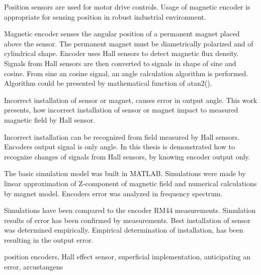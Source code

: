 \documentclass[a4paper,twoside,openright,12pt]{book}
\begin{document}
Position sensors are used for motor drive controls.
Usage of magnetic encoder is appropriate for sensing position in robust industrial environment.

Magnetic encoder senses the angular position of a permanent magnet placed above the sensor.
The permanent magnet must be diametrically polarized and of cylindrical shape.
Encoder uses Hall sensors to detect magnetic flux density.
Signals from Hall sensors are then converted to signals in shape of sine and cosine. From sine an cosine signal, an angle calculation algorithm is performed.
Algorithm could be presented by mathematical function of atan2().

Incorrect installation of sensor or magnet, causes error in output angle.
This work presents, how incorrect installation of sensor or magnet  impact to measured magnetic field by Hall sensor.

Incorrect installation can be recognized from field measured by Hall sensors. Encoders output signal is only angle.
In this thesis is demonstrated how to recognize changes of signals from Hall sensors, by knowing encoder output only.

The basic simulation model was built in MATLAB. Simulations were  made  by linear approximation of Z-component of magnetic field and numerical calculations by magnet model.
Encoders error was analyzed in frequency spectrum.

Simulations have been compared to the encoder RM44 measurements. 
Simulation results of error has been confirmed by measurements. Best installation of sensor was determined empirically. 
Empirical determination of installation, has been resulting in the output error.

\keywords position encoders, Hall effect sensor, superficial implementation, anticipating an error, arcustangens









\end{document}
